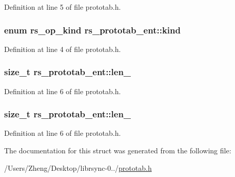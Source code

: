 Definition at line 5 of file prototab.\+h.

\hypertarget{structrs__prototab__ent_a60cdade47d5c7ab64059db7ae7f326e9}{}
\subsubsection[{kind}]{\setlength{\rightskip}{0pt plus 5cm}enum {\bf rs\+\_\+op\+\_\+kind} rs\+\_\+prototab\+\_\+ent\+::kind}\label{structrs__prototab__ent_a60cdade47d5c7ab64059db7ae7f326e9}


Definition at line 4 of file prototab.\+h.

\hypertarget{structrs__prototab__ent_a62141461a0f9fcf86d7e137a643df00f}{}
\subsubsection[{len\+\_\+1}]{\setlength{\rightskip}{0pt plus 5cm}size\+\_\+t rs\+\_\+prototab\+\_\+ent\+::len\+\_}\label{structrs__prototab__ent_a62141461a0f9fcf86d7e137a643df00f}


Definition at line 6 of file prototab.\+h.

\hypertarget{structrs__prototab__ent_ae15989881590213a8e63aa3e5e0a6447}{}
\subsubsection[{len\+\_\+2}]{\setlength{\rightskip}{0pt plus 5cm}size\+\_\+t rs\+\_\+prototab\+\_\+ent\+::len\+\_}\label{structrs__prototab__ent_ae15989881590213a8e63aa3e5e0a6447}


Definition at line 6 of file prototab.\+h.



The documentation for this struct was generated from the following file\+:\begin{DoxyCompactItemize}
\item 
/\+Users/\+Zheng/\+Desktop/librsync-\/0../\hyperlink{prototab_8h}{prototab.\+h}\end{DoxyCompactItemize}
